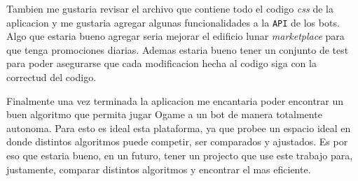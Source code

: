\documentclass{article}
\begin{document}
Tambien me gustaria revisar el archivo que contiene todo el codigo \textit{css} de la aplicacion y me gustaria agregar algunas funcionalidades a la \texttt{API} de los bots. Algo que estaria bueno agregar seria mejorar el edificio lunar \textit{marketplace} para que tenga promociones diarias. Ademas estaria bueno tener un conjunto de test para poder asegurarse que cada modificacion hecha al codigo siga con la correctud del codigo.

Finalmente una vez terminada la aplicacion me encantaria poder encontrar un buen algoritmo que permita jugar Ogame a un bot de manera totalmente autonoma. Para esto es ideal esta plataforma, ya que probee un espacio ideal en donde distintos algoritmos puede competir, ser comparados y ajustados. Es por eso que estaria bueno, en un futuro, tener un projecto que use este trabajo para, justamente, comparar distintos algoritmos y encontrar el mas eficiente.
\end{document}
